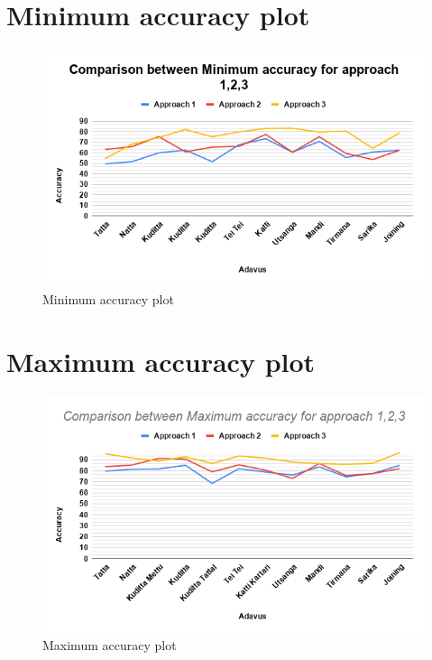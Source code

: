 \section{Minimum accuracy plot}
    \begin{figure}[H]
    \hspace{-2.5cm}    
    \includegraphics[scale= 0.8]{./Pictures/min.png}
    \caption{Minimum accuracy plot}
    \label{fig:Ch06F006}
\end{figure}

\section{Maximum accuracy plot}
    \begin{figure}[H]
    \hspace{-2.5cm}
    \includegraphics[scale= 0.8]{./Pictures/max.png}
    \caption{Maximum accuracy plot}
    \label{fig:Ch06F007}
\end{figure}
